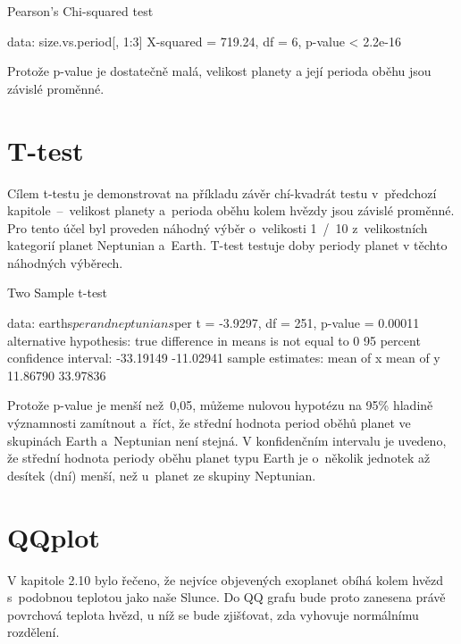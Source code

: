 \documentclass[a4paper,12pt]{article}
\begin{document}
\begin{Schunk}
\begin{Soutput}
	Pearson's Chi-squared test

data:  size.vs.period[, 1:3]
X-squared = 719.24, df = 6, p-value < 2.2e-16
\end{Soutput}
\end{Schunk}

Protože p-value je dostatečně malá, velikost planety a její perioda oběhu jsou závislé proměnné.

\section{T-test}

Cílem t-testu je demonstrovat na příkladu závěr chí-kvadrát testu v~předchozí kapitole~--~velikost planety a~perioda oběhu kolem hvězdy jsou závislé proměnné. Pro tento účel byl proveden náhodný výběr o~velikosti 1~/~10 z~velikostních kategorií planet Neptunian a~Earth. T-test testuje doby periody planet v těchto náhodných výběrech.

\begin{Schunk}
\begin{Soutput}
	Two Sample t-test

data:  earths$per and neptunians$per
t = -3.9297, df = 251, p-value = 0.00011
alternative hypothesis: true difference in means is not equal to 0
95 percent confidence interval:
 -33.19149 -11.02941
sample estimates:
mean of x mean of y 
 11.86790  33.97836 
\end{Soutput}
\end{Schunk}

Protože p-value je menší než~0,05, můžeme nulovou hypotézu na 95\% hladině významnosti zamítnout a~říct, že střední hodnota period oběhů planet ve skupinách Earth a~Neptunian není stejná. V konfidenčním intervalu je uvedeno, že střední hodnota periody oběhu planet typu Earth je o~několik jednotek až desítek (dní) menší, než u~planet ze skupiny Neptunian.

\section{QQplot}

V kapitole 2.10 bylo řečeno, že nejvíce objevených exoplanet obíhá kolem hvězd s~podobnou teplotou jako naše Slunce. Do QQ grafu bude proto zanesena právě povrchová teplota hvězd, u níž se bude zjišťovat, zda vyhovuje normálnímu rozdělení.
\end{document}

